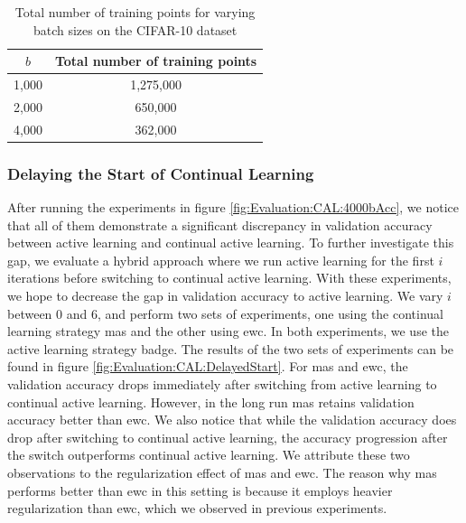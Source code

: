 \begin{table}[h]
    \centering
    \begin{tabular}{c | c } 
        $b$ & Total number of training points \\
        \hline 
        1,000 & 1,275,000 \\
        2,000 & 650,000 \\
        4,000 & 362,000 \\
    \end{tabular}
    \caption{Total number of training points for varying batch sizes on the CIFAR-10 dataset}
    \label{fig:Evaluation:CAL:NumberOfTrainingPoints}
\end{table}


\subsubsection{Delaying the Start of Continual Learning}
\label{sec:Evaluation:CAL:ALRegCL:Hybrid}
After running the experiments in figure \ref{fig:Evaluation:CAL:4000bAcc}, we notice that all of them demonstrate a significant discrepancy in validation accuracy
between active learning and continual active learning. To further investigate this gap, we evaluate a hybrid approach where we run active learning for the first $i$
iterations before switching to continual active learning. With these experiments, we hope to decrease the gap in validation accuracy to active learning. We vary $i$
between 0 and 6, and perform two sets of experiments, one using the continual learning strategy \gls{mas} and the other using \gls{ewc}. In both experiments, we use
the active learning strategy \gls{badge}. The results of the two sets of experiments can be found in figure  \ref{fig:Evaluation:CAL:DelayedStart}. For \gls{mas}
and \gls{ewc}, the validation accuracy drops immediately after switching from active learning to continual active learning. However, in the long run \gls{mas}
retains validation accuracy better than \gls{ewc}. We also notice that while the validation accuracy does drop after switching to continual active learning, the accuracy
progression after the switch outperforms continual active learning. We attribute these two observations to the regularization effect of \gls{mas} and \gls{ewc}. 
The reason why \gls{mas} performs better than \gls{ewc} in this setting is because it employs heavier regularization than \gls{ewc}, which we observed in previous
experiments. \par

